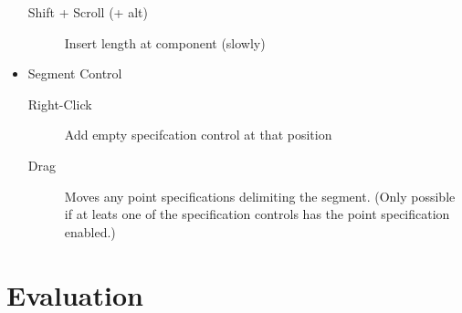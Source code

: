 \documentclass[a4paper]{article}
\begin{document}
\begin{itemize}
\begin{description}
							\item[Shift + Scroll (+ alt)] Insert length at component (slowly)
						\end{description}
						\item Segment Control
						\begin{description}
							\item[Right-Click] Add empty specifcation control at that position
							\item[Drag] Moves any point specifications delimiting the segment. (Only possible if at leats one of the specification controls has the point specification enabled.)
						\end{description}
					\end{itemize}
					

	\section{Evaluation}
\end{document}
